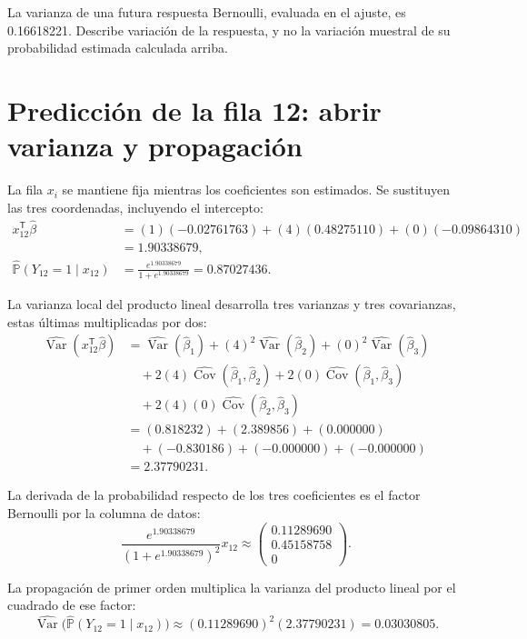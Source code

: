 \documentclass[11pt,a4paper]{article}
\newcommand{\Prob}{\mathbb P}
\newcommand{\T}{^{\mathsf T}}
\DeclareMathOperator{\Var}{Var}
\DeclareMathOperator{\Cov}{Cov}
\begin{document}
La varianza de una futura respuesta Bernoulli,
evaluada en el ajuste, es 0.16618221.
Describe variación de la respuesta, y no la variación
muestral de su probabilidad estimada calculada arriba.
\endgroup

\clearpage
\section{Predicción de la fila 12: abrir varianza y propagación}\label{logit121}
\begingroup\small
\setlength{\abovedisplayskip}{4pt}\setlength{\belowdisplayskip}{4pt}
La fila \(x_i\) se mantiene fija mientras los coeficientes
son estimados. Se sustituyen las tres coordenadas,
incluyendo el intercepto:
\[
\begin{aligned}
x_{12}\T\widehat\beta&=(1)(-0.02761763)+(4)(0.48275110)+(0)(-0.09864310)\\&=1.90338679,\\\widehat{\Prob}(Y_{12}=1\mid x_{12})&=\frac{e^{1.90338679}}{1+e^{1.90338679}}=0.87027436.\end{aligned}
\]

La varianza local del producto lineal desarrolla tres varianzas
y tres covarianzas, estas últimas multiplicadas por dos:
\[
\begin{aligned}
\widehat{\Var}(x_{12}\T\widehat\beta)&=\widehat{\Var}(\widehat\beta_1)+(4)^2\widehat{\Var}(\widehat\beta_2)+(0)^2\widehat{\Var}(\widehat\beta_3)\\&\quad+2(4)\widehat{\Cov}(\widehat\beta_1,\widehat\beta_2)+2(0)\widehat{\Cov}(\widehat\beta_1,\widehat\beta_3)\\&\quad+2(4)(0)\widehat{\Cov}(\widehat\beta_2,\widehat\beta_3)\\&=(0.818232)+(2.389856)+(0.000000)\\&\quad+(-0.830186)+(-0.000000)+(-0.000000)\\&=2.37790231.\end{aligned}
\]

La derivada de la probabilidad respecto de los tres coeficientes
es el factor Bernoulli por la columna de datos:
\[
\frac{e^{1.90338679}}{(1+e^{1.90338679})^2}x_{12}\approx\begin{pmatrix}0.11289690\\0.45158758\\0\end{pmatrix}.
\]

La propagación de primer orden multiplica la varianza del
producto lineal por el cuadrado de ese factor:
\[
\widehat{\Var}\bigl(\widehat{\Prob}(Y_{12}=1\mid x_{12})\bigr)\approx(0.11289690)^2(2.37790231)=0.03030805.
\]
\end{document}
